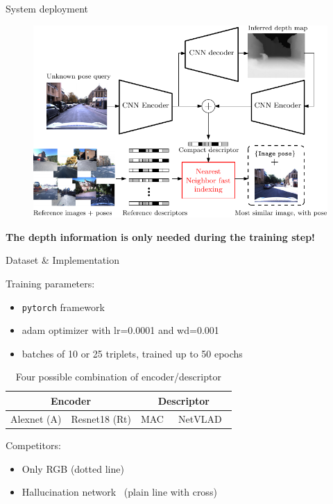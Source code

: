 \documentclass[final]{beamer}
\newlength{\colwidth}
\begin{document}
\begin{frame}[t]
\begin{columns}[t]
\begin{column}{\colwidth}
  \begin{block}{System deployment}
	\begin{figure}
	  \centering
	  \includegraphics[width=\linewidth]{vect/method/fig4/final}
	\end{figure}

	\textbf{The depth information is only needed during the training step!}
  \end{block}
	
  \vspace{1.5cm}
  	
  \begin{block}{Dataset \& Implementation}
  
  Training parameters:
  \begin{itemize}
  	\item \texttt{pytorch} framework
  	\item adam optimizer with lr=0.0001 and wd=0.001
  	\item batches of 10 or 25 triplets, trained up to 50 epochs
  \end{itemize}
  
	\begin{table}
  \begin{tabular}{l | l || l | l}
  	\multicolumn{2}{c}{\textbf{Encoder}} & \multicolumn{2}{c}{\textbf{Descriptor}} \\
  	\hline
	Alexnet (A) & Resnet18 (Rt) & MAC~\cite{Radenovic2017} & NetVLAD~\cite{Arandjelovic2017} \\
  \end{tabular}
  \caption{Four possible combination of encoder/descriptor}
  \end{table}
  
  Competitors:
  \begin{itemize}
  	\item Only RGB (dotted line)
  	\item Hallucination network~\cite{Hoffman2016} (plain line with cross)
  \end{itemize}
  

\end{block}
\end{column}
\end{columns}
\end{frame}
\end{document}
